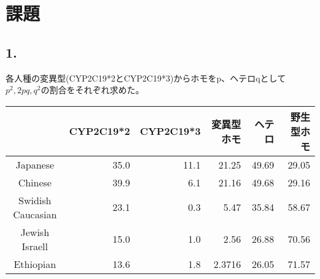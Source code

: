 \documentclass[a4paper,papersize,dvipdfmx]{jsarticle}
\begin{document}
\section*{課題}

\subsection*{1.}
各人種の変異型(CYP2C19*2とCYP2C19*3)からホモをp、ヘテロqとして$p^2,2pq,q^2$の割合をそれぞれ求めた。

\begin{table}[H]
\begin{center}
\begin{tabular}{|c|r|r|r|r|r|}
\hline
& CYP2C19*2 & CYP2C19*3 & 変異型ホモ & ヘテロ & 野生型ホモ \\ \hline
Japanese          & 35.0                & 11.1            & 21.25          & 49.69         & 29.05               \\ \hline
Chinese           & 39.9                & 6.1             & 21.16          & 49.68         & 29.16                \\ \hline
Swidish Caucasian & 23.1                & 0.3             & 5.47          & 35.84          & 58.67                 \\ \hline
Jewish Israell    & 15.0                & 1.0             & 2.56          & 26.88           & 70.56               \\ \hline
Ethiopian         & 13.6                & 1.8             & 2.3716        & 26.05          & 71.57               \\ \hline
\end{tabular}
\end{center}
\end{table}
\end{document}
